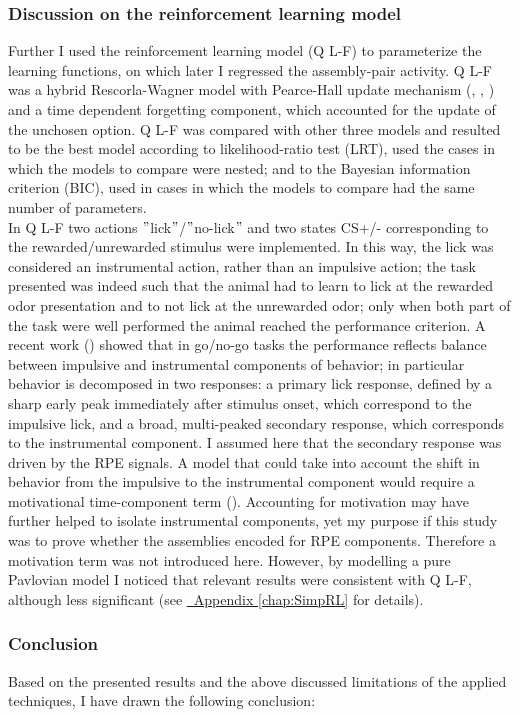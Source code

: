 \subsubsection{Discussion on the reinforcement learning model}
Further I used the reinforcement learning model (Q L-F) to parameterize the learning functions, on which later I regressed the assembly-pair activity. Q L-F was a hybrid Rescorla-Wagner model with Pearce-Hall update mechanism (\cite{Koppe}, \cite{Li}, \cite{Costa}) and a time dependent forgetting component, which accounted for the update of the unchosen option. Q L-F was compared with other three models and resulted to be the best model according to likelihood-ratio test (LRT), used the cases in which the models to compare were nested; and to the Bayesian information criterion (BIC), used in cases in which the models to compare had the same number of parameters.\\In Q L-F two actions $"$lick$"$/$"$no-lick$"$ and two states CS+/- corresponding to the rewarded/unrewarded stimulus were implemented. In this way, the lick was considered an instrumental action, rather than an impulsive action; the task presented was indeed such that the animal had to learn to lick at the rewarded odor presentation and to not lick at the unrewarded odor; only when both part of the task were well performed the animal  reached the performance criterion. A recent work (\cite{SchultzMot}) showed that in go/no-go tasks the performance reflects balance between impulsive and instrumental components of behavior; in particular behavior is decomposed in two  responses: a primary lick response, defined by a sharp early peak immediately after stimulus onset, which correspond to the impulsive lick, and a broad, multi-peaked secondary response, which corresponds to the instrumental component. I assumed here that the secondary response was driven by the RPE signals. A model that could take into account the shift in behavior from the impulsive to the instrumental component would require a motivational time-component term (\cite{SchultzMot}). Accounting for motivation may have further helped to isolate instrumental components, yet my purpose if this study was to prove  whether the assemblies encoded for RPE components. Therefore a motivation term was not introduced here. However, by modelling a pure Pavlovian model I noticed that relevant results were consistent with Q L-F, although less significant (see \hyperref[chap:SimpRL]{~Appendix \ref*{chap:SimpRL}} for details). 
\subsubsection{Conclusion}
Based on the presented results and the above discussed limitations of the applied techniques, I have drawn the following conclusion:

